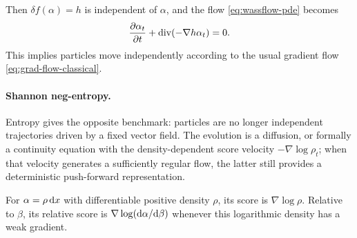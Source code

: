 \begin{example}
   Then $\delta f(\alpha) = h$ is independent of $\alpha$, and the flow \eqref{eq:wassflow-pde} becomes
   \begin{equation*}
       \frac{\partial \alpha_t}{\partial t} + \operatorname{div}(-\nabla h \alpha_t) = 0.
   \end{equation*}
   This implies particles move independently according to the usual gradient flow \eqref{eq:grad-flow-classical}.
\end{example}

\paragraph{Shannon neg-entropy.}


Entropy gives the opposite benchmark: particles are no longer independent trajectories driven by a fixed vector field. The evolution is a diffusion, or formally a continuity equation with the density-dependent score velocity $-\nabla\log\rho_t$; when that velocity generates a sufficiently regular flow, the latter still provides a deterministic push-forward representation.

\begin{defn}\label{def-score-function}
For $\alpha=\rho\,\mathrm{d} x$ with differentiable positive density $\rho$, its score is $\nabla\log\rho$. Relative to $\beta$, its relative score is $\nabla\log(\mathrm{d}\alpha/\mathrm{d}\beta)$ whenever this logarithmic density has a weak gradient.
\end{defn}

